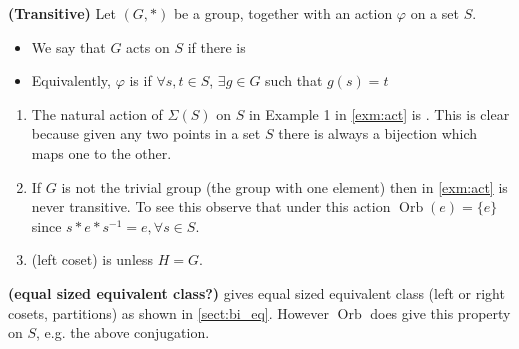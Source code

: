 \documentclass{article}
\newcommand{\bfs}[1]{\textbf{({#1}) }}
\newcommand{\Orb}{\operatorname{Orb}}
\begin{document}
\begin{defa}{\bfs{Transitive}}Let $(G, *)$ be a group, together with an action $\varphi$ on a set $S$.
\begin{itemize}
    \item   We say that $G$ acts  on $S$ if there is  
    \item  Equivalently, $\varphi$ is  if  $\forall s, t \in S$, $\exists g \in G$ such that $g(s)=t$
\end{itemize}
\end{defa} 
\begin{exma}\text{ } 
\begin{enumerate}
    \item The natural action of $\Sigma(S)$ on $S$ in Example 1 in \cref{exm:act} is . This is clear because given any two points in a set $S$ there is always a bijection which maps one to the other. 
    \item If $G$ is not the trivial group (the group with one element) then  in \cref{exm:act} is never transitive. To see this observe that under this action $\operatorname{Orb}(e)=\{e\}$ since $s*e*s^{-1}=e, \forall s\in S$.
    \item {} (left coset) is  unless $H=G$.
\end{enumerate}
\end{exma}
\begin{rema}{\bfs{equal sized equivalent class?}}\label{rm:eqec}
  gives equal sized equivalent class (left or right cosets, partitions) as shown in \cref{sect:bi_eq}. However $\Orb$ does  give this property on $S$, e.g. the above conjugation.
\end{rema}
\end{document}

